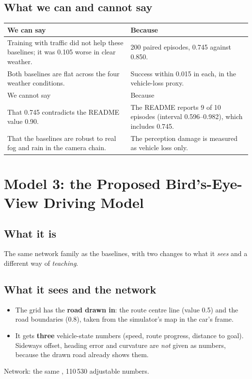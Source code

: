 \documentclass[11pt,a4paper]{article}
\begin{document}
\subsection{What we can and cannot say}
\begin{tabularx}{\textwidth}{@{}>{\raggedright\arraybackslash}p{5.2cm}X@{}}\toprule
We can say & Because\\\midrule
Training with traffic did not help these baselines; it was 0.105 worse in clear weather. & 200 paired episodes, 0.745 against 0.850.\\
Both baselines are flat across the four weather conditions. & Success within 0.015 in each, in the vehicle-loss proxy.\\\midrule
We cannot say & Because\\\midrule
That 0.745 contradicts the README value 0.90. & The README reports 9 of 10 episodes (interval 0.596--0.982), which includes 0.745.\\
That the baselines are robust to real fog and rain in the camera chain. & The perception damage is measured as vehicle loss only.\\\bottomrule
\end{tabularx}

\section{Model 3: the Proposed Bird's-Eye-View Driving Model}
\subsection{What it is}
The same network family as the baselines, with two changes to what it \emph{sees} and a different way of \emph{teaching}.
\subsection{What it sees and the network}
\begin{itemize}
\item The grid has the \textbf{road drawn in}: the route centre line (value 0.5) and the road boundaries (0.8), taken from the simulator's map in the car's frame.
\item It gets \textbf{three} vehicle-state numbers (speed, route progress, distance to goal). Sideways offset, heading error and curvature are \emph{not} given as numbers, because the drawn road already shows them.
\end{itemize}
Network: the same , 110\,530 adjustable numbers.
\end{document}
